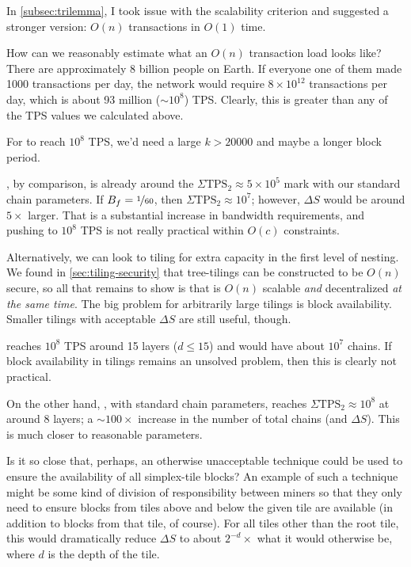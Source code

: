 In \autoref{subsec:trilemma}, I took issue with the scalability criterion and suggested a stronger version: $O(n)$ transactions in $O(1)$ time.

How can we reasonably estimate what an $O(n)$ transaction load looks like?
There are approximately 8 billion people on Earth.
If everyone one of them made 1000 transactions per day, the network would require $8 \times 10^{12}$ transactions per day, which is about 93 million ($\sim 10^8$) TPS.
Clearly, this is greater than any of the TPS values we calculated above.

For  to reach $10^8$ TPS, we'd need a large $k > 20000$ and maybe a longer block period.

, by comparison, is already around the $\Sigma \text{TPS}_2 \approx 5 \times 10^5$ mark with our standard chain parameters.
If $B_f = \nicefrac{1}{60}$, then $\Sigma \text{TPS}_2 \approx 10^7$; however, $\Delta S$ would be around $5\times$ larger.
That is a substantial increase in bandwidth requirements, and pushing to $10^8$ TPS is not really practical within $O(c)$ constraints.

Alternatively, we can look to tiling for extra capacity in the first level of nesting.
We found in \autoref{sec:tiling-security} that tree-tilings can be constructed to be $O(n)$ secure, so all that remains to show is that \UTinf{} is $O(n)$ scalable \emph{and} decentralized \emph{at the same time}.
The big problem for arbitrarily large tilings is block availability.
Smaller tilings with acceptable $\Delta S$ are still useful, though.

 reaches $10^8$ TPS around 15 layers ($d \le 15$) and would have about $10^7$ chains.
If block availability in tilings remains an unsolved problem, then this is clearly not practical.

On the other hand, , with standard chain parameters, reaches $\Sigma \text{TPS}_2 \approx 10^8$ at around 8 layers; a $\sim 100\times$ increase in the number of total chains (and $\Delta S$).
This is much closer to reasonable parameters.

Is it so close that, perhaps, an otherwise unacceptable technique could be used to ensure the availability of all simplex-tile blocks?
An example of such a technique might be some kind of division of responsibility between miners so that they only need to ensure blocks from tiles above and below the given tile are available (in addition to blocks from that tile, of course).
For all tiles other than the root tile, this would dramatically reduce $\Delta S$ to about $2^{-d}\times$ what it would otherwise be, where $d$ is the depth of the tile.

